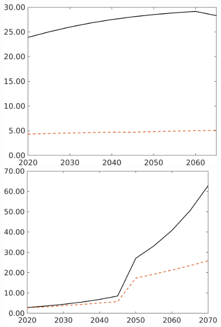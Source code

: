\begin{figure}[h!!]
	\begin{minipage}[]{0.32\textwidth}
		\includegraphics[width=1\textwidth]{../../codding_model/own_basedOnFried/optimalPol_190722_tidiedUp/figures/all_10Aout22/gAagg_CompEffOPT_T_NoTaus_regime3_opteff_spillover0_noskill0_sep1_xgrowth0_countec0_etaa0.79_lgd0_lff0.png}
	\end{minipage}
	\begin{minipage}[]{0.32\textwidth}
		\includegraphics[width=1\textwidth]{../../codding_model/own_basedOnFried/optimalPol_190722_tidiedUp/figures/all_10Aout22/GFF_CompEffOPT_T_NoTaus_regime3_opteff_spillover0_noskill0_sep1_xgrowth0_countec0_etaa0.79_lgd0_lff0.png}

\end{minipage}
\end{figure}
